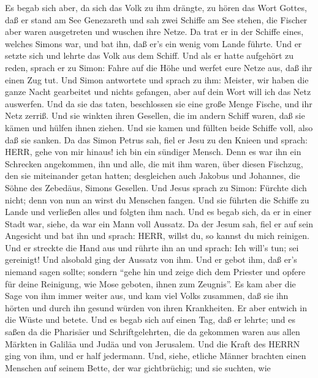  Es begab sich aber, da sich das Volk zu ihm drängte, zu
hören das Wort Gottes, daß er stand am See Genezareth  und
sah zwei Schiffe am See stehen, die Fischer aber waren ausgetreten und
wuschen ihre Netze.  Da trat er in der Schiffe eines,
welches Simons war, und bat ihn, daß er's ein wenig vom Lande führte.
Und er setzte sich und lehrte das Volk aus dem Schiff.  Und
als er hatte aufgehört zu reden, sprach er zu Simon: Fahre auf die Höhe
und werfet eure Netze aus, daß ihr einen Zug tut.  Und Simon
antwortete und sprach zu ihm: Meister, wir haben die ganze Nacht
gearbeitet und nichts gefangen, aber auf dein Wort will ich das Netz
auswerfen.  Und da sie das taten, beschlossen sie eine große
Menge Fische, und ihr Netz zerriß.  Und sie winkten ihren
Gesellen, die im andern Schiff waren, daß sie kämen und hülfen ihnen
ziehen. Und sie kamen und füllten beide Schiffe voll, also daß sie
sanken.  Da das Simon Petrus sah, fiel er Jesu zu den Knieen
und sprach: HERR, gehe von mir hinaus! ich bin ein sündiger Mensch.
 Denn es war ihn ein Schrecken angekommen, ihn und alle, die
mit ihm waren, über diesen Fischzug, den sie miteinander getan hatten;
 desgleichen auch Jakobus und Johannes, die Söhne des
Zebedäus, Simons Gesellen. Und Jesus sprach zu Simon: Fürchte dich
nicht; denn von nun an wirst du Menschen fangen.  Und sie
führten die Schiffe zu Lande und verließen alles und folgten ihm nach.
 Und es begab sich, da er in einer Stadt war, siehe, da war
ein Mann voll Aussatz. Da der Jesum sah, fiel er auf sein Angesicht und
bat ihn und sprach: HERR, willst du, so kannst du mich reinigen.
 Und er streckte die Hand aus und rührte ihn an und sprach:
Ich will's tun; sei gereinigt! Und alsobald ging der Aussatz von ihm.
 Und er gebot ihm, daß er's niemand sagen sollte; sondern
``gehe hin und zeige dich dem Priester und opfere für deine Reinigung,
wie Mose geboten, ihnen zum Zeugnis''.  Es kam aber die
Sage von ihm immer weiter aus, und kam viel Volks zusammen, daß sie ihn
hörten und durch ihn gesund würden von ihren Krankheiten. 
Er aber entwich in die Wüste und betete.  Und es begab sich
auf einen Tag, daß er lehrte; und es saßen da die Pharisäer und
Schriftgelehrten, die da gekommen waren aus allen Märkten in Galiläa und
Judäa und von Jerusalem. Und die Kraft des HERRN ging von ihm, und er
half jedermann.  Und, siehe, etliche Männer brachten einen
Menschen auf seinem Bette, der war gichtbrüchig; und sie suchten, wie
